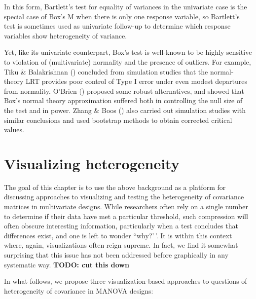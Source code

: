 \documentclass[
  letterpaper,
  10pt,
  krantz2]{krantz}
\begin{document}
In this form, Bartlett's test for equality of variances in the
univariate case is the special case of Box's M when there is only one
response variable, so Bartlett's test is sometimes used as univariate
follow-up to determine which response variables show heterogeneity of
variance.

Yet, like its univariate counterpart, Box's test is well-known to be
highly sensitive to violation of (multivariate) normality and the
presence of outliers. For example, Tiku \& Balakrishnan
() concluded from simulation
studies that the normal-theory LRT provides poor control of Type I error
under even modest departures from normality. O'Brien
() proposed some robust alternatives,
and showed that Box's normal theory approximation suffered both in
controlling the null size of the test and in power. Zhang \& Boos
() also carried out simulation
studies with similar conclusions and used bootstrap methods to obtain
corrected critical values.

\section{Visualizing heterogeneity}\label{visualizing-heterogeneity}

The goal of this chapter is to use the above background as a platform
for discussing approaches to visualizing and testing the heterogeneity
of covariance matrices in multivariate designs. While researchers often
rely on a single number to determine if their data have met a particular
threshold, such compression will often obscure interesting information,
particularly when a test concludes that differences exist, and one is
left to wonder ``why?'\,'. It is within this context where, again,
visualizations often reign supreme. In fact, we find it somewhat
surprising that this issue has not been addressed before graphically in
any systematic way. \textbf{TODO: cut this down}

In what follows, we propose three visualization-based approaches to
questions of heterogeneity of covariance in MANOVA designs:
\end{document}
